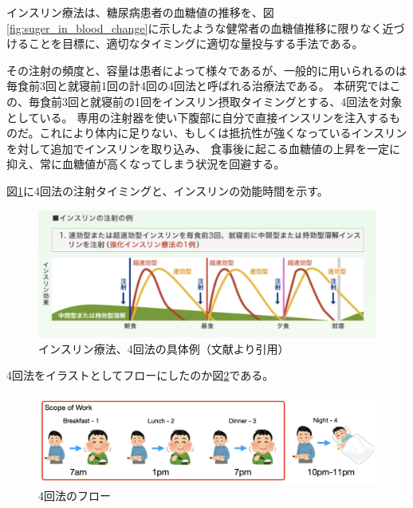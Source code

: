 インスリン療法は、糖尿病患者の血糖値の推移を、図\ref{fig:suger_in_blood_change}に示したような健常者の血糖値推移に限りなく近づけることを目標に、適切なタイミングに適切な量投与する手法である。

その注射の頻度と、容量は患者によって様々であるが、一般的に用いられるのは毎食前3回と就寝前1回の計4回の4回法と呼ばれる治療法である。\cite{insulin_treatment_method}\cite{diabetes_treatment_type1}
本研究ではこの、毎食前3回と就寝前の1回をインスリン摂取タイミングとする、4回法を対象としている。
専用の注射器を使い下腹部に自分で直接インスリンを注入するものだ。これにより体内に足りない、もしくは抵抗性が強くなっているインスリンを対して追加でインスリンを取り込み、
食事後に起こる血糖値の上昇を一定に抑え、常に血糖値が高くなってしまう状況を回避する。

図\ref{fig:insulin_4times_method}に4回法の注射タイミングと、インスリンの効能時間を示す。

\begin{figure}[htbp]
  \caption{インスリン療法、4回法の具体例（文献\cite{insulin_4times_method}より引用）}
  \label{fig:insulin_4times_method}
  \begin{center}
    \includegraphics[bb=0 0 700 300,width=15cm]{assets/insulin_4times_method.png}
  \end{center}
\end{figure}

4回法をイラストとしてフローにしたのか図\ref{fig:insulin_4times_method_flow}である。

\begin{figure}[htbp]
  \caption{4回法のフロー}
  \label{fig:insulin_4times_method_flow}
  \begin{center}
    \includegraphics[bb=0 0 1000 300,width=15cm]{assets/insulin_4times_method_flow.png}
  \end{center}
\end{figure}

